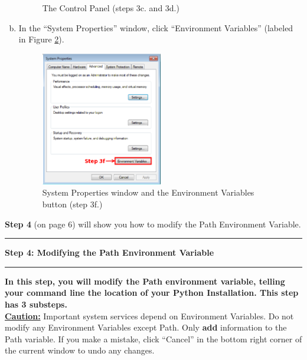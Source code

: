 \documentclass[11pt,english]{article}
\newcommand{\myhrule}{\vspace{0.3cm}\hrule\vspace{0.3cm}}
\begin{document}
\begin{enumerate}[a.]
\begin{figure}[h]
\vspace{-0.5cm}
\caption{The Control Panel (steps 3c. and 3d.)}
\label{fig:dia5}
\end{figure}
\item In the ``System Properties'' window, click ``Environment
Variables'' (labeled in Figure \ref{fig:dia6}).
\begin{figure}[h]
\begin{center}
\includegraphics[width=0.5\textwidth]{dia6}
\end{center}
\vspace{-0.5cm}
\caption{System Properties window and the Environment Variables button (step
3f.)}
\label{fig:dia6}
\end{figure}
\end{enumerate}
\vfill
{\bf Step 4} (on page 6) will show you how to modify the Path Environment
Variable.
\myhrule

\newpage
{\Large {\bf Step 4: Modifying the Path Environment Variable}}
\myhrule
{\bf In this step, you will modify the Path environment variable, telling your
command line the location of your Python Installation. This step has
3 substeps.}\\

{\bf \color{red} \underline{Caution:}} Important system services depend on
Environment Variables. Do not modify any Environment Variables
except Path. Only {\bf add} information to the Path variable. If you make a
mistake, click ``Cancel'' in the bottom right corner of the current window to
undo any changes.
\end{document}
